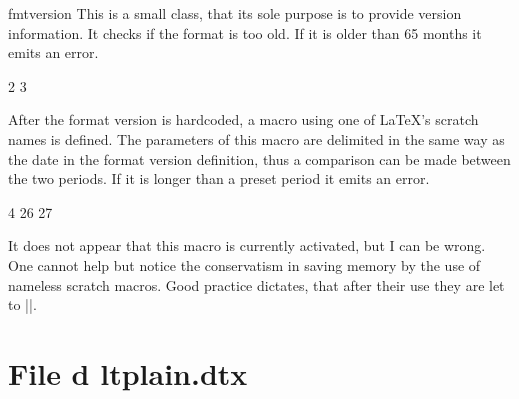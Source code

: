\begin{macro}{\fmtname}
\begin{macro}{fmtversion}
This is a small class,  that its sole purpose is to provide version information. It checks
if the format is too old. If it is older than 65 months it emits an error. 
\end{macro}
\end{macro}


\begin{teXXX}
2 \def\fmtname{LaTeX2e}
3 \edef\fmtversion{2011/06/27}
\end{teXXX}

After the format version is hardcoded, a macro using one of LaTeX's scratch names is defined. The parameters
of this macro are delimited in the same way as the date in the format version definition, thus a comparison can be made between the two periods. If it is longer than a preset period it emits an error.

\begin{teXXX}
4 \iffalse
5 \def\reserved@a#1/#2/#3\@nil{%
6   \count@\year
7   \advance\count@-#1\relax
8   \multiply\count@ by 12\relax
9   \advance\count@\month
10 \advance\count@-#2\relax}
11 \expandafter\reserved@a\fmtversion\@nil
12 \ifnum\count@>65
13     \typeout{^^J%
14     !!!!!!!!!!!!!!!!!!!!!!!!!!!!!!!!!!!!!!!!!!!!!!!^^J%
15     ! You are attempting to make a LaTeX format from a source file^^J%
16     ! That is more than five years old.^^J%
17     !^^J%
18     ! If you enter <return> to scroll past this message then the format^^J%
19     ! will be built, but please consider obtaining newer source files^^J%
20     ! before continuing to build LaTeX.^^J%
21     !!!!!!!!!!!!!!!!!!!!!!!!!!!!!!!!!!!!!!!!!!!!!!!!^^J%
22     }
23     \errhelp{To avoid this error message, obtain new LaTeX sources.}
24     \errmessage{LaTeX source files more than 5 years old!}
25 \fi
26 \let\reserved@a\relax
27 \fi
\end{teXXX}

It does not appear that this macro is currently activated, but I can be wrong. One cannot help but notice the conservatism in saving memory by the use of nameless scratch macros. Good practice dictates, that after their use they are let to |\relax|.

\begin{texexample}{}{}
\fmtname  [\fmtversion]
\end{texexample}


\section{File d ltplain.dtx}

